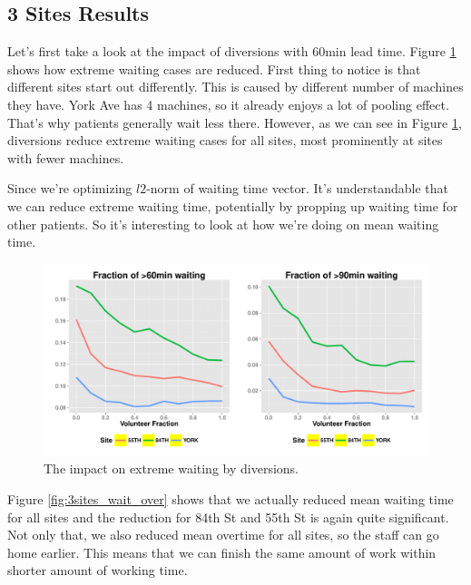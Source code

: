 \subsection{3 Sites Results}

Let's first take a look at the impact of diversions with 60min
lead time. Figure \ref{fig:3sites_extreme} shows how extreme
waiting cases are reduced. First thing to notice is that
different sites start out differently. This is caused by
different number of machines they have. York Ave has 4 machines,
so it already enjoys a lot of pooling effect. That's why patients
generally wait less there. However, as we can see in Figure \ref{fig:3sites_extreme},
diversions reduce extreme waiting cases for all sites, most
prominently at sites with fewer machines.

Since we're optimizing $l2$-norm of waiting time vector.
It's understandable that we can reduce extreme waiting time,
potentially by propping up waiting time for other patients.
So it's interesting to look at how we're doing on mean waiting
time.

\begin{figure}[htp]
\centering
\includegraphics[width=.95\textwidth]{chap3/numeric/pic/3sites_extreme}
\caption{The impact on extreme waiting by diversions.}
\label{fig:3sites_extreme}
\end{figure}

Figure \ref{fig:3sites_wait_over} shows that we actually
reduced mean waiting time for all sites and the reduction
for 84th St and 55th St is again quite significant.
Not only that, we also reduced mean overtime for all sites, so
the staff can go home earlier. This means that we can finish
the same amount of work within shorter amount of working time.

